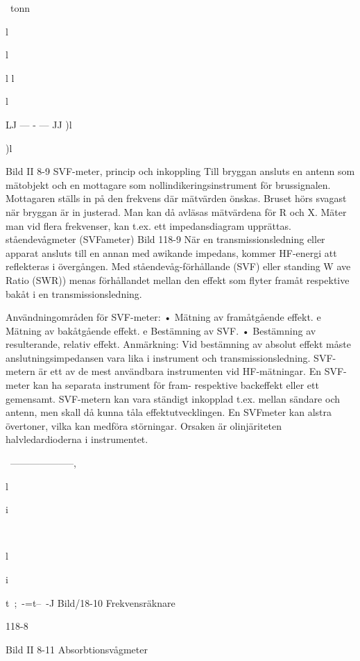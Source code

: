 \documentclass[a4paper,twoside,twocolumn,openright]{book}
\begin{document}
{{{{{~tonn

l

l

l
l

l

LJ --- - --- JJ
)l

)l

Bild II 8-9 SVF-meter, princip och inkoppling
Till bryggan ansluts en antenn som mätobjekt och en mottagare som nollindikeringsinstrument för brussignalen. Mottagaren
ställs in på den frekvens där mätvärden
önskas. Bruset hörs svagast när bryggan är
in justerad. Man kan då avläsas mätvärdena
för R och X. Mäter man vid flera frekvenser,
kan t.ex. ett impedansdiagram upprättas.
ståendevågmeter (SVFameter)
Bild 118-9
När en transmissionsledning eller apparat
ansluts till en annan med awikande impedans, kommer HF-energi att reflekteras i
övergången.
Med ståendevåg-förhållande (SVF) eller
standing W ave Ratio (SWR)) menas förhållandet mellan den effekt som flyter framåt
respektive bakåt i en transmissionsledning.

Användningområden för SVF-meter:
• Mätning av framåtgående effekt.
e Mätning av bakåtgående effekt.
e Bestämning av SVF.
• Bestämning av resulterande, relativ effekt.
Anmärkning: Vid bestämning av absolut
effekt måste anslutningsimpedansen vara
lika i instrument och transmissionsledning.
SVF-metern är ett av de mest användbara instrumenten vid HF-mätningar. En
SVF-meter kan ha separata instrument för
fram- respektive backeffekt eller ett gemensamt.
SVF-metern kan vara ständigt inkopplad
t.ex. mellan sändare och antenn, men skall
då kunna tåla effektutvecklingen. En SVFmeter kan alstra övertoner, vilka kan medföra störningar. Orsaken är olinjäriteten
halvledardioderna i instrumentet.

~--------------------,

l

i

~

l

i

t~;~-=t--~-J
Bild/18-10 Frekvensräknare

118-8

Bild II 8-11 Absorbtionsvågmeter

}}}}}
\end{document}
